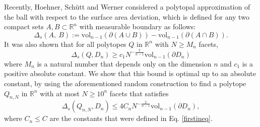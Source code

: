\documentclass[10pt, twoside, leqno]{article}
\theoremstyle{definition}
\numberwithin{equation}{section}
\newcommand{\R}{\mathbb{R}}
\newcommand{\NN}{N^{-\frac 2{n-1} }}
\begin{document}
%	
%
%

Recently, Hoehner, Sch\"utt and Werner \cite{Wer15}  considered a polytopal approximation of the ball with respect to the  surface area deviation, which is defined for any two compact sets $ A,B \subset\R^n$ with measurable boundary as follows: 
\[
	\Delta_s\left(A,\ B\right) := \text{vol}_{n-1}\left(\partial\left(A\cup B\right)\right) - \text{vol}_{n-1}\left(\partial\left(A\cap B\right)\right).
\]
It was also shown that for all polytopes $ Q $ in $ \R^n $ with $ N \geq {M}_n$ facets,%
\[
\Delta_s\left(Q,D_n\right) \geq c_1\NN\text{vol}_{n-1}\left(\partial D_n\right)
\]
where ${M}_n$ is a natural number that depends only on the dimension $ n $ and  $ c_1$ is a positive absolute constant.  
We show that this bound is optimal up to an absolute constant, by using the aforementioned random construction to find a polytope  $ Q_{n,N}$ in $ \R^n $ with at most $ N \geq 10^n $ facets that satisfies \[ \Delta_s\left(Q_{n,N},D_n\right) \leq 4C_n\NN\text{vol}_{n-1}\left(\partial D_n\right),\]
where $ C_n \leq C$ are the constants that were defined in Eq. \eqref{firstineq}. 
\end{document}
